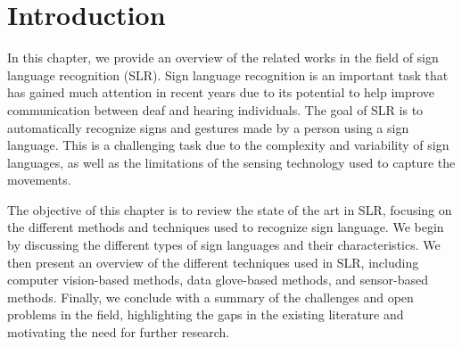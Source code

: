 \section{Introduction}
In this chapter, we provide an overview of the related works in the field of sign language recognition (SLR). Sign language recognition is an important task that has gained much attention in recent years due to its potential to help improve communication between deaf and hearing individuals. The goal of SLR is to automatically recognize signs and gestures made by a person using a sign language. This is a challenging task due to the complexity and variability of sign languages, as well as the limitations of the sensing technology used to capture the movements.

The objective of this chapter is to review the state of the art in SLR, focusing on the different methods and techniques used to recognize sign language. We begin by discussing the different types of sign languages and their characteristics. We then present an overview of the different techniques used in SLR, including computer vision-based methods, data glove-based methods, and sensor-based methods. Finally, we conclude with a summary of the challenges and open problems in the field, highlighting the gaps in the existing literature and motivating the need for further research.